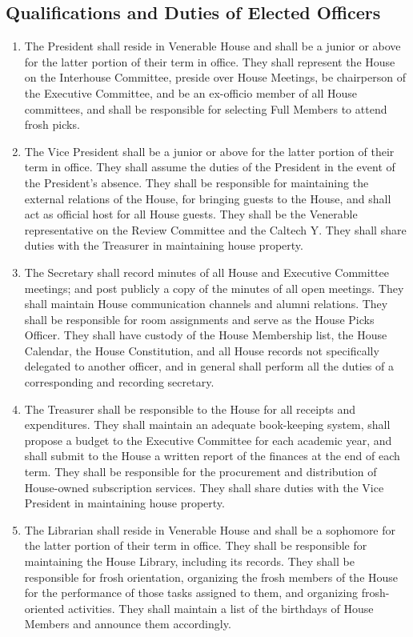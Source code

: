 \documentclass[10pt]{article} %
\begin{document}
\subsection{Qualifications and Duties of Elected Officers}
\label{ElectedDuties}
\begin{enumerate}
\item The President shall reside in Venerable House and shall be a junior or above for the latter portion of their term in office. They shall represent the House on the Interhouse Committee, preside over House Meetings, be chairperson of the Executive Committee, and be an ex-officio member of all House committees, and shall be responsible for selecting Full Members to attend frosh picks.
\item The Vice President shall be a junior or above for the latter portion of their term in office. They shall assume the duties of the President in the event of the President's absence. They shall be responsible for maintaining the external relations of the House, for bringing guests to the House, and shall act as official host for all House guests. They shall be the Venerable representative on the Review Committee and the Caltech Y. They shall share duties with the Treasurer in maintaining house property.
\item The Secretary shall record minutes of all House and Executive Committee meetings; and post publicly a copy of the minutes of all open meetings. They shall maintain House communication channels and alumni relations. They shall be responsible for room assignments and serve as the House Picks Officer. They shall have custody of the House Membership list, the House Calendar, the House Constitution, and all House records not specifically delegated to another officer, and in general shall perform all the duties of a corresponding and recording secretary.
\item The Treasurer shall be responsible to the House for all receipts and expenditures. They shall maintain an adequate book-keeping system, shall propose a budget to the Executive Committee for each academic year, and shall submit to the House a written report of the finances at the end of each term. They shall be responsible for the procurement and distribution of House-owned subscription services. They shall share duties with the Vice President in maintaining house property.
\item The Librarian shall reside in Venerable House and shall be a sophomore for the latter portion of their term in office. They shall be responsible for maintaining the House Library, including its records. They shall be responsible for frosh orientation, organizing the frosh members of the House for the performance of those tasks assigned to them, and organizing frosh-oriented activities. They shall maintain a list of the birthdays of House Members and announce them accordingly.

\end{enumerate}
\end{document}
